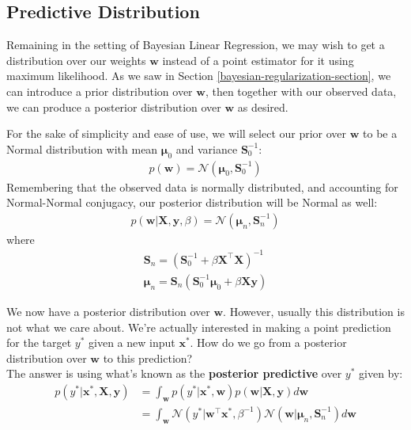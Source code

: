 \subsection{Predictive Distribution}
Remaining in the setting of Bayesian Linear Regression, we may wish to get a distribution over our weights $\mathbf{w}$ instead of a point estimator for it using maximum likelihood. As we saw in Section \ref{bayesian-regularization-section}, we can introduce a prior distribution over $\mathbf{w}$, then together with our observed data, we can produce a posterior distribution over $\mathbf{w}$ as desired.

\begin{derivation}
    For the sake of simplicity and ease of use, we will select our prior over $\mathbf{w}$ to be a Normal distribution with mean $\boldsymbol{\mu}_0$ and variance $\boldsymbol{S}_0^{-1}$:
    \begin{align*}
        p(\mathbf{w}) = \mathcal{N}(\boldsymbol{\mu}_0, \boldsymbol{S}_0^{-1})
    \end{align*}
    Remembering that the observed data is normally distributed, and accounting for Normal-Normal conjugacy, our posterior distribution will be Normal as well:
    \begin{align*}
        p(\mathbf{w}|\mathbf{X},\mathbf{y}, \beta) = \mathcal{N}(\boldsymbol{\mu}_n, \boldsymbol{S}_n^{-1})
    \end{align*}
    where
    \begin{align*}
        \boldsymbol{S}_n = (\boldsymbol{S}_0^{-1} + \beta\mathbf{X}^\top\mathbf{X})^{-1} \\
        \boldsymbol{\mu}_n = \boldsymbol{S}_n(\boldsymbol{S}_0^{-1}\boldsymbol{\mu}_0 + \beta\mathbf{X}\mathbf{y})
    \end{align*}

    We now have a posterior distribution over $\mathbf{w}$. However, usually this distribution is not what we care about. We're actually interested in making a point prediction for the target $y^*$ given a new input $\mathbf{x}^*$. How do we go from a posterior distribution over $\mathbf{w}$ to this prediction? \\

    The answer is using what's known as the \textbf{posterior predictive} over $y^*$ given by:
    \begin{equation}
    \begin{split}
        p(y^* | \mathbf{x}^*, \mathbf{X}, \mathbf{y}) &= \int_{\mathbf{w}} p(y^* | \mathbf{x}^*, \mathbf{w})p(\mathbf{w} | \mathbf{X}, \mathbf{y})d\mathbf{w} \\
        &= \int_{\mathbf{w}} \mathcal{N}(y^* | \mathbf{w}^\top\mathbf{x}^*, \beta^{-1})\mathcal{N}(\mathbf{w} | \boldsymbol{\mu}_n, \boldsymbol{S}_n^{-1})d\mathbf{w}
    \end{split}
    \end{equation}
\end{derivation}

